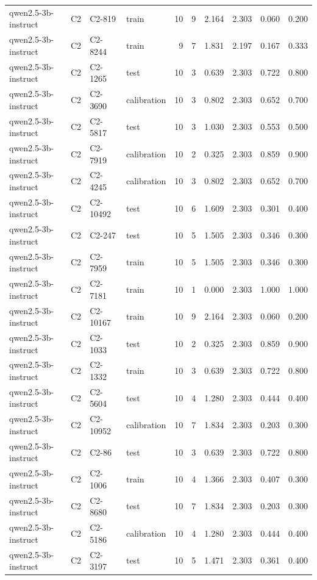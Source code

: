 \begin{table}
\begin{tabular}{llllrrrrrr}
qwen2.5-3b-instruct & C2 & C2-819 & train & 10 & 9 & 2.164 & 2.303 & 0.060 & 0.200 \\
qwen2.5-3b-instruct & C2 & C2-8244 & train & 9 & 7 & 1.831 & 2.197 & 0.167 & 0.333 \\
qwen2.5-3b-instruct & C2 & C2-1265 & test & 10 & 3 & 0.639 & 2.303 & 0.722 & 0.800 \\
qwen2.5-3b-instruct & C2 & C2-3690 & calibration & 10 & 3 & 0.802 & 2.303 & 0.652 & 0.700 \\
qwen2.5-3b-instruct & C2 & C2-5817 & test & 10 & 3 & 1.030 & 2.303 & 0.553 & 0.500 \\
qwen2.5-3b-instruct & C2 & C2-7919 & calibration & 10 & 2 & 0.325 & 2.303 & 0.859 & 0.900 \\
qwen2.5-3b-instruct & C2 & C2-4245 & calibration & 10 & 3 & 0.802 & 2.303 & 0.652 & 0.700 \\
qwen2.5-3b-instruct & C2 & C2-10492 & test & 10 & 6 & 1.609 & 2.303 & 0.301 & 0.400 \\
qwen2.5-3b-instruct & C2 & C2-247 & test & 10 & 5 & 1.505 & 2.303 & 0.346 & 0.300 \\
qwen2.5-3b-instruct & C2 & C2-7959 & train & 10 & 5 & 1.505 & 2.303 & 0.346 & 0.300 \\
qwen2.5-3b-instruct & C2 & C2-7181 & train & 10 & 1 & 0.000 & 2.303 & 1.000 & 1.000 \\
qwen2.5-3b-instruct & C2 & C2-10167 & train & 10 & 9 & 2.164 & 2.303 & 0.060 & 0.200 \\
qwen2.5-3b-instruct & C2 & C2-1033 & test & 10 & 2 & 0.325 & 2.303 & 0.859 & 0.900 \\
qwen2.5-3b-instruct & C2 & C2-1332 & train & 10 & 3 & 0.639 & 2.303 & 0.722 & 0.800 \\
qwen2.5-3b-instruct & C2 & C2-5604 & test & 10 & 4 & 1.280 & 2.303 & 0.444 & 0.400 \\
qwen2.5-3b-instruct & C2 & C2-10952 & calibration & 10 & 7 & 1.834 & 2.303 & 0.203 & 0.300 \\
qwen2.5-3b-instruct & C2 & C2-86 & test & 10 & 3 & 0.639 & 2.303 & 0.722 & 0.800 \\
qwen2.5-3b-instruct & C2 & C2-1006 & train & 10 & 4 & 1.366 & 2.303 & 0.407 & 0.300 \\
qwen2.5-3b-instruct & C2 & C2-8680 & test & 10 & 7 & 1.834 & 2.303 & 0.203 & 0.300 \\
qwen2.5-3b-instruct & C2 & C2-5186 & calibration & 10 & 4 & 1.280 & 2.303 & 0.444 & 0.400 \\
qwen2.5-3b-instruct & C2 & C2-3197 & test & 10 & 5 & 1.471 & 2.303 & 0.361 & 0.400 \\

\end{tabular}
\end{table}
